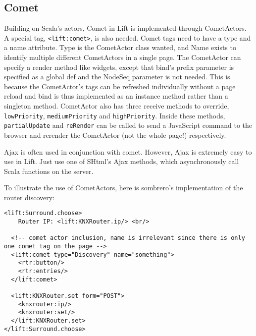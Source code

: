 \subsection{Comet}

Building on Scala's actors, Comet in Lift is implemented through CometActors. A special tag, \lstinline!<lift:comet>!, is also needed. Comet tags need to have a type and a name attribute. Type is the CometActor class wanted, and Name exists to identify multiple different CometActors in a single page. The CometActor can specify a render method like widgets, except that bind's prefix parameter is specified as a global def and the NodeSeq parameter is not needed. This is because the CometActor's tags can be refreshed individually without a page reload and bind is thus implemented as an instance method rather than a singleton method. CometActor also has three receive methods to override, \lstinline!lowPriority!, \lstinline!mediumPriority! and \lstinline!highPriority!. Inside these methods, \lstinline!partialUpdate! and \lstinline!reRender! can be called to send a JavaScript command to the browser and rerender the CometActor (not the whole page!) respectively.

Ajax is often used in conjunction with comet. However, Ajax is extremely easy to use in Lift. Just use one of SHtml's Ajax methods, which asynchronously call Scala functions on the server.

To illustrate the use of CometActors, here is sombrero's implementation of the router discovery:

\begin{lstlisting}[caption=Lift Comet: discovery.html,label=lst:lift:cometxhtml]
<lift:Surround.choose>
    Router IP: <lift:KNXRouter.ip/> <br/>
    
  <!-- comet actor inclusion, name is irrelevant since there is only one comet tag on the page -->
  <lift:comet type="Discovery" name="something">
    <rtr:button/>
    <rtr:entries/>
  </lift:comet>
  
  <lift:KNXRouter.set form="POST">
    <knxrouter:ip/>
    <knxrouter:set/>
  </lift:KNXRouter.set>
</lift:Surround.choose>
\end{lstlisting}

